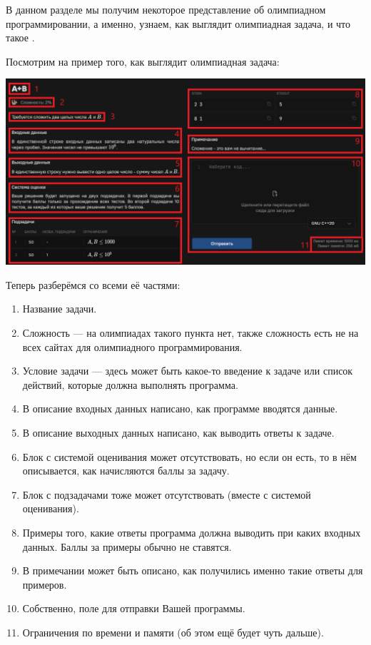 В данном разделе мы получим некоторое представление об олимпиадном программировании, а именно, узнаем, как выглядит олимпиадная задача, и что такое .

Посмотрим на пример того, как выглядит олимпиадная задача:

\includegraphics[scale=0.66]{img/task.png}

Теперь разберёмся со всеми её частями:
\begin{enumerate}
    \item Название задачи.
    \item Сложность — на олимпиадах такого пункта нет, также сложность есть не на всех сайтах для олимпиадного программирования.
    \item Условие задачи — здесь может быть какое-то введение к задаче или список действий, которые должна выполнять программа. 
    \item В описание входных данных написано, как программе вводятся данные.
    \item В описание выходных данных написано, как выводить ответы к задаче.
    \item Блок с системой оценивания может отсутствовать, но если он есть, то в нём описывается, как начисляются баллы за задачу.
    \item Блок с подзадачами тоже может отсутствовать (вместе с системой оценивания).
    \item Примеры того, какие ответы программа должна выводить при каких входных данных. Баллы за примеры обычно не ставятся.
    \item В примечании может быть описано, как получились именно такие ответы для примеров.
    \item Собственно, поле для отправки Вашей программы.
    \item Ограничения по времени и памяти (об этом ещё будет чуть дальше).
\end{enumerate}

